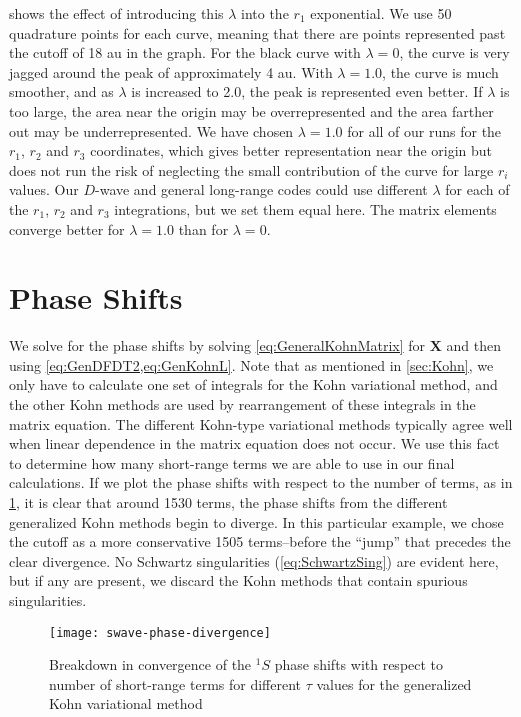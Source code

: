 \documentclass[Dissertation.tex]{subfiles}
\begin{document}
 shows the effect of introducing this $\lambda$ into the $r_1$
exponential. We use 50 quadrature points for each curve, meaning that there 
are points represented past the cutoff of 18 au in the graph. For the black 
curve with $\lambda = 0$, the curve is very jagged around the peak of 
approximately 4 au. With $\lambda = 1.0$, the curve is much smoother, and as
$\lambda$ is increased to 2.0, the peak is represented even better. If $\lambda$
is too large, the area near the origin may be overrepresented and the area 
farther out may be underrepresented. We have chosen $\lambda = 1.0$ for all 
of our runs for the $r_1$, $r_2$ and $r_3$ coordinates, which gives better
representation near the origin but does not  run the risk of neglecting the
small contribution of the curve for large $r_i$ values. Our $D$-wave and
general long-range codes could use different $\lambda$ for each of the
$r_1$, $r_2$ and $r_3$ integrations, but we set them equal here. The matrix
elements converge better for $\lambda = 1.0$ than for $\lambda = 0$.


\section{Phase Shifts}
\label{sec:CompPhase}

We solve for the phase shifts by solving \cref{eq:GeneralKohnMatrix} for
$\boldsymbol{X}$ and then using \cref{eq:GenDFDT2,eq:GenKohnL}. Note that
as mentioned in \cref{sec:Kohn}, we only have to calculate one set of integrals
for the Kohn variational method, and the other Kohn methods are
used by rearrangement of these integrals in the matrix equation. The different
Kohn-type variational methods typically agree well when linear dependence in the
matrix equation does not occur. We use this fact to determine how many
short-range terms we are able to use in our final calculations. If we plot the
phase shifts with respect to the number of terms, as in \cref{fig:swave-phase-divergence},
it is clear that around 1530 terms, the phase shifts from the different
generalized Kohn methods begin to diverge. In this particular example, we
chose the cutoff as a more conservative 1505 terms--before the ``jump'' that 
precedes the clear divergence. No Schwartz singularities (\cref{eq:SchwartzSing})
are evident here, but if any are present, we discard the Kohn methods that
contain spurious singularities.

\begin{figure}
	\centering
	\texttt{[image: swave-phase-divergence]}
	\caption{Breakdown in convergence of the $^1S$ phase
shifts with respect to number of short-range terms for different $\tau$
values for the generalized Kohn variational method}
	\label{fig:swave-phase-divergence}
\end{figure}
\end{document}
